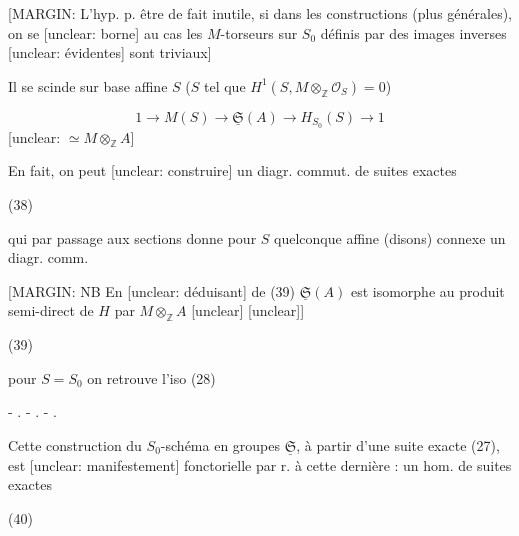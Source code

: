 [MARGIN: L'hyp. p. être de fait inutile, si dans les constructions (plus générales), on se [unclear: borne] au cas les $M$-torseurs sur $S_0$ définis par des images inverses [unclear: évidentes] sont triviaux]

Il se scinde sur base affine $S$
($S$ tel que $H^1(S, M \otimes_{\mathbb{Z}} \mathcal{O}_S) = 0$)

$$ 1 \to M(S) \to \underline{\mathfrak{S}}(A) \to H_{S_0}(S) \to 1 $$
[unclear: $\simeq M \otimes_{\mathbb{Z}} A$] \quad [unclear: si $S = Spec A$] 

\newpage


En fait, on peut [unclear: construire] un diagr.
commut. de suites exactes

(38)

qui par passage aux sections donne
pour $S$ quelconque affine (disons) connexe
un diagr. comm.

[MARGIN: NB En [unclear: déduisant] de (39)
$\underline{\mathfrak{S}}(A)$ est isomorphe
au produit semi-direct
de $H$ par
$M \otimes_{\mathbb{Z}} A$
[unclear]
[unclear]]

(39)

pour $S=S_0$ on retrouve l'iso (28)

- . - . - .

Cette construction du $S_0$-schéma en
groupes $\underline{\mathfrak{S}}$, à partir d'une
suite exacte (27), est [unclear: manifestement]
fonctorielle par r. à cette dernière : un
hom. de suites exactes

(40)

